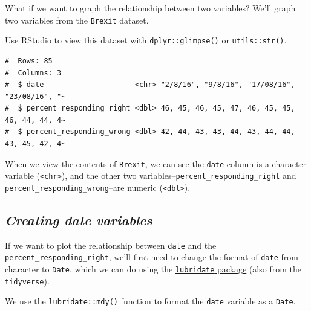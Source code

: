 \documentclass[letterpaper,12pt,twoside,]{pinp}
\begin{document}
What if we want to graph the relationship between two variables? We'll
graph two variables from the \texttt{Brexit} dataset.

Use RStudio to view this dataset with \texttt{dplyr::glimpse()} or
\texttt{utils::str()}.

\begin{Shaded}
\begin{Highlighting}[]
\end{Highlighting}
\end{Shaded}

\begin{ShadedResult}
\begin{verbatim}
#  Rows: 85
#  Columns: 3
#  $ date                     <chr> "2/8/16", "9/8/16", "17/08/16", "23/08/16", "~
#  $ percent_responding_right <dbl> 46, 45, 46, 45, 47, 46, 45, 45, 46, 44, 44, 4~
#  $ percent_responding_wrong <dbl> 42, 44, 43, 43, 44, 43, 44, 44, 43, 45, 42, 4~
\end{verbatim}
\end{ShadedResult}

When we view the contents of \texttt{Brexit}, we can see the
\texttt{date} column is a character variable
(\texttt{\textless{}chr\textgreater{}}), and the other two
variables--\texttt{percent\_responding\_right} and
\texttt{percent\_responding\_wrong}--are numeric
(\texttt{\textless{}dbl\textgreater{}}).

\hypertarget{creating-date-variables}{%
\subsection{\texorpdfstring{\textbf{\emph{Creating date
variables}}}{Creating date variables}}\label{creating-date-variables}}

If we want to plot the relationship between \texttt{date} and the
\texttt{percent\_responding\_right}, we'll first need to change the
format of \texttt{date} from character to \texttt{Date}, which we can do
using the \href{https://lubridate.tidyverse.org/}{\texttt{lubridate}
package} (also from the \texttt{tidyverse}).

We use the \texttt{lubridate::mdy()} function to format the
\texttt{date} variable as a \texttt{Date}.

\begin{Shaded}
\begin{Highlighting}[]
\OtherTok{\textless{}{-}}\SpecialCharTok{\%\textgreater{}\%} \NormalTok{(}\SpecialCharTok{::}
\end{Highlighting}
\end{Shaded}
\end{document}
